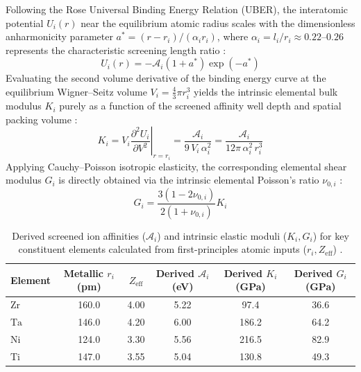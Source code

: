 \documentclass[aps,prmaterials,reprint,superscriptaddress,amsmath,amssymb,floatfix]{revtex4-2}
\begin{document}
Following the Rose Universal Binding Energy Relation (UBER), the interatomic potential $U_i(r)$ near the equilibrium atomic radius scales with the dimensionless anharmonicity parameter $a^* = (r - r_i)/(\alpha_i r_i)$, where $\alpha_i = l_i / r_i \approx 0.22\text{--}0.26$ represents the characteristic screening length ratio \cite{Rose1981PRL,Rose1984}:
\begin{equation}
U_i(r) = -\mathcal{A}_i (1 + a^*) \exp(-a^*)
\label{eq:rose_uber}
\end{equation}
Evaluating the second volume derivative of the binding energy curve at the equilibrium Wigner--Seitz volume $V_i = \frac{4}{3}\pi r_i^3$ yields the intrinsic elemental bulk modulus $K_i$ purely as a function of the screened affinity well depth and spatial packing volume \cite{Rose1984,Ferrante1983PRL,Moruzzi1978}:
\begin{equation}
K_i = \left. V_i \frac{\partial^2 U_i}{\partial V^2} \right|_{r = r_i} = \frac{\mathcal{A}_i}{9 \, V_i \, \alpha_i^2} = \frac{\mathcal{A}_i}{12\pi \, \alpha_i^2 \, r_i^3}
\label{eq:derived_bulk}
\end{equation}
Applying Cauchy--Poisson isotropic elasticity, the corresponding elemental shear modulus $G_i$ is directly obtained via the intrinsic elemental Poisson's ratio $\nu_{0,i}$ \cite{Hill1952,Love1927,LandauLifshitz1986}:
\begin{equation}
G_i = \frac{3(1 - 2\nu_{0,i})}{2(1 + \nu_{0,i})} K_i
\label{eq:derived_shear}
\end{equation}

\begin{table}[t]
\caption{\label{tab:derived_affinities}Derived screened ion affinities ($\mathcal{A}_i$) and intrinsic elastic moduli ($K_i, G_i$) for key constituent elements calculated from first-principles atomic inputs ($r_i, Z_{\text{eff}}$) \cite{WignerSeitz1933,Rose1984,Hill1952,Love1927,LandauLifshitz1986}.}
\begin{ruledtabular}
\begin{tabular}{l c c c c c}
Element & Metallic $r_i$ (pm) & $Z_{\text{eff}}$ & Derived $\mathcal{A}_i$ (eV) & Derived $K_i$ (GPa) & Derived $G_i$ (GPa) \\
\hline
$\text{Zr}$ & 160.0 & 4.00 & 5.22 & 97.4  & 36.6 \\
$\text{Ta}$ & 146.0 & 4.20 & 6.00 & 186.2 & 64.2 \\
$\text{Ni}$ & 124.0 & 3.30 & 5.56 & 216.5 & 82.9 \\
$\text{Ti}$ & 147.0 & 3.55 & 5.04 & 130.8 & 49.3 \\
\end{tabular}
\end{ruledtabular}
\end{table}
\end{document}
